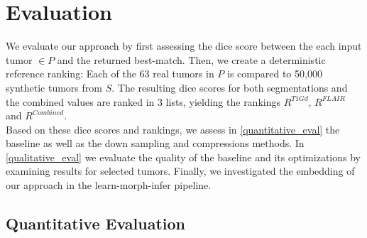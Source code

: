 
\chapter{Evaluation}\label{chapter:evaluation}
We evaluate our approach by first assessing the dice score between the each input tumor $\in P$ and the returned best-match. 
Then, we create a deterministic reference ranking:
Each of the 63 real tumors in $P$ is compared to 50,000 synthetic tumors from $S$. The resulting dice scores for both segmentations and the combined values are ranked in 3 lists, yielding the rankings $R^{T1Gd}$, $R^{FLAIR}$ and $R^{Combined}$.\\
Based on these dice scores and rankings, we assess in \autoref{quantitative_eval} the baseline as well as the down sampling and compressions methods.
In \autoref{qualitative_eval} we evaluate the quality of the baseline and its optimizations by examining results for selected tumors.
Finally, we investigated the embedding of our approach in the learn-morph-infer pipeline.
\section{Quantitative Evaluation}\label{quantitative_eval}

